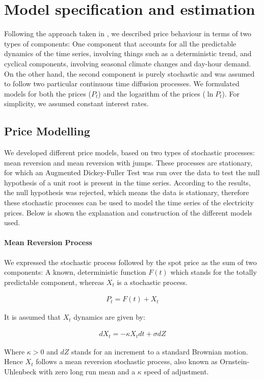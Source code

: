 \documentclass[3p]{elsarticle}
\begin{document}
\section{Model specification and estimation}\label{ch:MEE}
Following the approach taken in \citep{Lucia2002a}, we described price behaviour in terms of two types of components: One component that accounts for all the predictable dynamics of the time series, involving things such as a deterministic trend, and cyclical components, involving seasonal climate changes and day-hour demand. On the other hand, the second component is purely stochastic and was assumed to follow two particular continuous time diffusion processes. We formulated models for both the prices ($P_t$) and the logarithm of the prices ($\ln P_t$). For simplicity, we assumed constant interest rates.

\subsection{Price Modelling}
We developed different price models, based on two types of stochastic processes: mean reversion and mean reversion with jumps. These processes are stationary, for which an Augmented Dickey-Fuller Test was run over the data to test the null hypothesis of a unit root is present in the time series. According to the results, the null hypothesis was rejected, which means the data is stationary, therefore these stochastic processes can be used to model the time series of the electricity prices. Below is shown the explanation and construction of the different models used.

\paragraph{Mean Reversion Process}
We expressed the stochastic process followed by the spot price as the sum of two components: A known, deterministic function $F(t)$ which stands for the totally predictable component, whereas $X_t$ is a stochastic process.

\begin{align}
\label{eq:sP}
P_t=F(t)+X_t
\end{align}

It is assumed that $X_t$ dynamics are given by:

\begin{align}
\label{eq:sX}
dX_t=-\kappa X_tdt+\sigma dZ
\end{align}

Where $\kappa>0$ and $dZ$ stands for an increment to a standard Brownian motion. Hence $X_t$ follows a mean reversion stochastic process, also known as Ornstein-Uhlenbeck \citep{Dixit1994} with zero long run mean and a $\kappa$ speed of adjustment.
\end{document}
